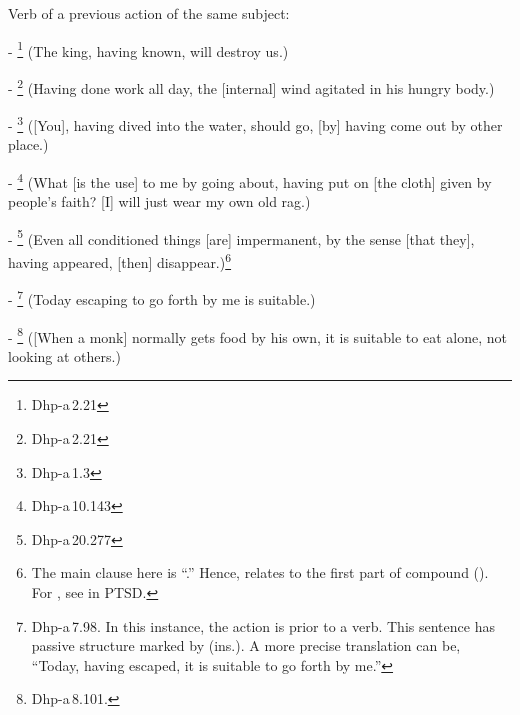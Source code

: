 \begin{compactenum}[(1)]
\item Verb of a previous action of the same subject:\par
- \footnote{Dhp-a\,2.21} (The king, having known, will destroy us.)\par
- \footnote{Dhp-a\,2.21} (Having done work all day, the [internal] wind agitated in his hungry body.)\par
- \footnote{Dhp-a\,1.3} ([You], having dived into the water, should go, [by] having come out by other place.)\par
- \footnote{Dhp-a\,10.143} (What [is the use] to me by going about, having put on [the cloth] given by people's faith? [I] will just wear my own old rag.)\par
- \footnote{Dhp-a\,20.277} (Even all conditioned things [are] impermanent, by the sense [that they], having appeared, [then] disappear.)\footnote{The main clause here is ``.'' Hence,  relates to the first part of compound  (). For , see  in PTSD.}\par
- \footnote{Dhp-a\,7.98. In this instance, the  action is prior to a  verb. This sentence has passive structure marked by  (ins.). A more precise translation can be, ``Today, having escaped, it is suitable to go forth by me.''} (Today escaping to go forth by me is suitable.)\par
- \footnote{Dhp-a\,8.101.} ([When a monk] normally gets food by his own, it is suitable to eat alone, not looking at others.)\par


\end{compactenum}
